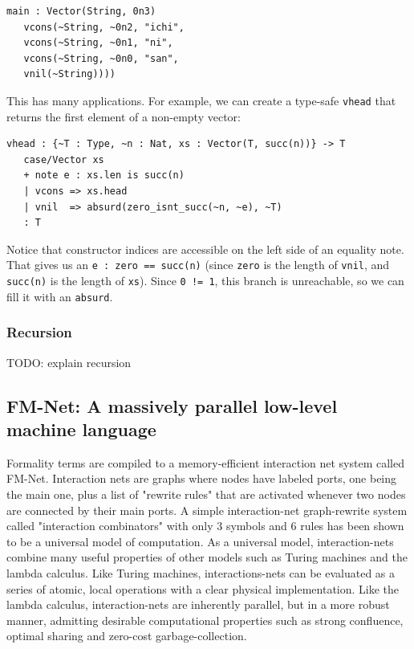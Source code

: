 \documentclass{article}
\theoremstyle{definition}
\theoremstyle{theorem}
\begin{document}
\begin{lstlisting}
main : Vector(String, 0n3)
   vcons(~String, ~0n2, "ichi",
   vcons(~String, ~0n1, "ni",
   vcons(~String, ~0n0, "san",
   vnil(~String))))
\end{lstlisting}

This has many applications. For example, we can create a type-safe \verb|vhead|
that returns the first element of a non-empty vector:

\begin{lstlisting}
vhead : {~T : Type, ~n : Nat, xs : Vector(T, succ(n))} -> T
   case/Vector xs
   + note e : xs.len is succ(n)
   | vcons => xs.head
   | vnil  => absurd(zero_isnt_succ(~n, ~e), ~T) 
   : T
\end{lstlisting}

Notice that constructor indices are accessible on the left side of an equality
note. That gives us an \verb|e : zero == succ(n)| (since \verb|zero| is the
length of \verb|vnil|, and \verb|succ(n)| is the length of \verb|xs|). Since
\verb|0 != 1|, this branch is unreachable, so we can fill it with an
\verb|absurd|.

\subsubsection{Recursion}

TODO: explain recursion

\subsection{FM-Net: A massively parallel low-level machine language}

Formality terms are compiled to a memory-efficient interaction net system called
FM-Net. Interaction nets are graphs where nodes have labeled ports, one
being the main one, plus a list of "rewrite rules" that are activated whenever
two nodes are connected by their main ports. A simple interaction-net
graph-rewrite system called "interaction combinators" with only 3 symbols and 6
rules has been shown to be a universal model of computation. As a universal
model, interaction-nets combine many useful properties of other models such as
Turing machines and the lambda calculus. Like Turing machines, interactions-nets
can be evaluated as a series of atomic, local operations with a clear physical
implementation. Like the lambda calculus, interaction-nets are inherently
parallel, but in a more robust manner, admitting desirable computational
properties such as strong confluence, optimal sharing and zero-cost
garbage-collection.
\end{document}

